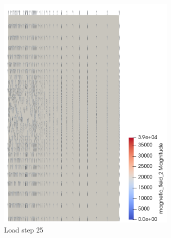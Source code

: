 \documentclass[11pt,a4paper,final]{article}
\begin{document}
\begin{figure}[h]
\centering
\begin{subfigure}{0.32\textwidth}
\centering
\includegraphics[width=0.95\textwidth]{magnetic_field_25.png}
\caption{Load step 25}
\label{fig:3.7.1}
\end{subfigure}
\begin{subfigure}{0.32\textwidth}
\centering

\end{subfigure}
\end{figure}
\end{document}
